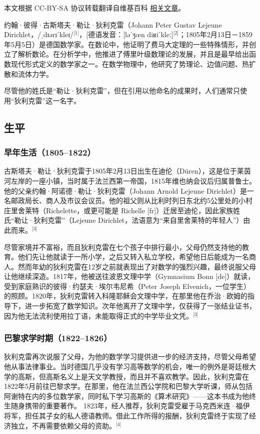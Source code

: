 
本文根据 CC-BY-SA 协议转载翻译自维基百科 \href{https://en.wikipedia.org/wiki/Peter_Gustav_Lejeune_Dirichlet}{相关文章}。

约翰·彼得·古斯塔夫·勒让·狄利克雷（Johann Peter Gustav Lejeune Dirichlet，/ˌdɪərɪˈkleɪ/\(^\text{[1]}\)，[德语发音：[ləˈʒœn diʁiˈkleː]\(^\text{[2]}\)；1805年2月13日－1859年5月5日）是德国数学家。在数论中，他证明了费马大定理的一些特殊情形，并创立了解析数论。在分析学中，他推进了傅里叶级数理论的发展，并且是最早给出函数现代形式定义的数学家之一。在数学物理中，他研究了势理论、边值问题、热扩散和流体力学。

尽管他的姓氏是“勒让·狄利克雷”，但在引用以他命名的成果时，人们通常只使用“狄利克雷”这一名字。
\subsection{生平}
\subsubsection{早年生活（1805–1822）}
古斯塔夫·勒让·狄利克雷于1805年2月13日出生在迪伦（Düren），这是位于莱茵河左岸的一座小镇，当时属于法兰西第一帝国，1815年维也纳会议后归属普鲁士。他的父亲约翰·阿诺德·勒让·狄利克雷（Johann Arnold Lejeune Dirichlet）是一名邮政局长、商人及市议会议员。他的祖父则从比利时列日东北约5公里处的小村庄里舍莱特（Richelette，或更可能是 Richelle [fr]）迁居至迪伦，因此家族姓氏“勒让·狄利克雷”（Lejeune Dirichlet，法语意为“来自里舍莱特的年轻人”）由此而来。\(^\text{[3]}\)

尽管家境并不富裕，而且狄利克雷在七个孩子中排行最小，父母仍然支持他的教育。他们先让他就读于一所小学，之后又转入私立学校，希望他日后能成为一名商人。然而年幼的狄利克雷在12岁之前就表现出了对数学的强烈兴趣，最终说服父母让他继续深造。1817年，他被送往波恩文理中学（Gymnasium Bonn [de]）就读，受到家庭熟识的彼得·约瑟夫·埃尔韦尼希（Peter Joseph Elvenich，一位学生）的照顾。1820年，狄利克雷转入科隆耶稣会文理中学，在那里他在乔治·欧姆的指导下，进一步拓宽了数学知识。次年他离开了文理中学，仅获得了一张结业证书，因为他无法流利使用拉丁语，未能取得正式的中学毕业文凭。\(^\text{[3]}\)
\subsubsection{巴黎求学时期（1822–1826）}
狄利克雷再次说服了父母，为他的数学学习提供进一步的经济支持，尽管父母希望他从事法律事业。当时德国几乎没有学习高等数学的机会，唯一的例外是哥廷根大学的高斯，但高斯名义上是天文学教授，而且并不喜欢教学。因此，狄利克雷在1822年5月前往巴黎求学。在那里，他在法兰西公学院和巴黎大学听课，师从包括阿谢特在内的多位数学家，同时私下学习高斯的《算术研究》——这本书成为他终生随身携带的重要著作。
1823年，经人推荐，狄利克雷受雇于马克西米连·福伊将军，担任其子女的私人德语教师。借此工作所得的报酬，狄利克雷终于实现了经济独立，不再需要依赖父母的资助。\(^\text{[4]}\)

